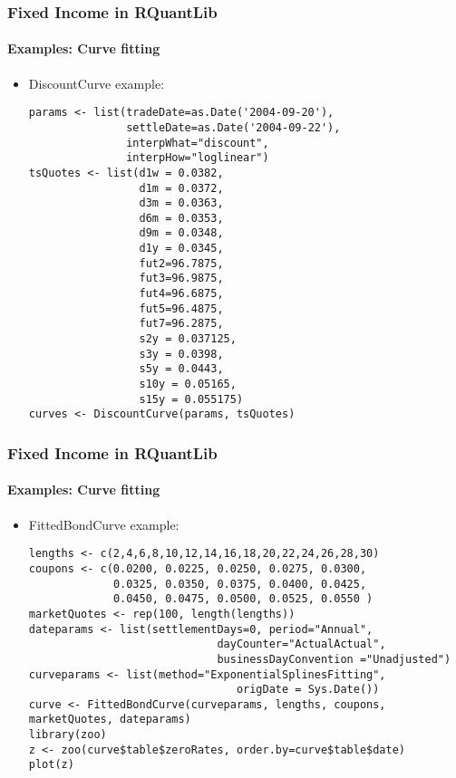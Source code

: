 \documentclass[smaller,compress]{beamer}
\begin{document}
\begin{frame}[fragile]
	\frametitle{Fixed Income in RQuantLib}
	\framesubtitle{Examples: Curve fitting}
	\begin{itemize}
		\item DiscountCurve example:		

			\lstset{language=R,basicstyle=\tiny}
				\begin{lstlisting}		
params <- list(tradeDate=as.Date('2004-09-20'),
               settleDate=as.Date('2004-09-22'),
               interpWhat="discount",
               interpHow="loglinear")
tsQuotes <- list(d1w = 0.0382,
                 d1m = 0.0372,
                 d3m = 0.0363,
                 d6m = 0.0353,
                 d9m = 0.0348,
                 d1y = 0.0345,
                 fut2=96.7875,
                 fut3=96.9875,
                 fut4=96.6875,
                 fut5=96.4875,
                 fut7=96.2875,
                 s2y = 0.037125,
                 s3y = 0.0398,
                 s5y = 0.0443,
                 s10y = 0.05165,
                 s15y = 0.055175)
curves <- DiscountCurve(params, tsQuotes)		
\end{lstlisting}
\end{itemize}
\end{frame}



\begin{frame}[fragile]
	\frametitle{Fixed Income in RQuantLib}
	\framesubtitle{Examples: Curve fitting}
	\begin{itemize}
		\item FittedBondCurve example:
			\lstset{language=R,basicstyle=\tiny}
				\begin{lstlisting}
lengths <- c(2,4,6,8,10,12,14,16,18,20,22,24,26,28,30)
coupons <- c(0.0200, 0.0225, 0.0250, 0.0275, 0.0300,
         	 0.0325, 0.0350, 0.0375, 0.0400, 0.0425,
             0.0450, 0.0475, 0.0500, 0.0525, 0.0550 )
marketQuotes <- rep(100, length(lengths))
dateparams <- list(settlementDays=0, period="Annual", 
                             dayCounter="ActualActual", 
                             businessDayConvention ="Unadjusted")
curveparams <- list(method="ExponentialSplinesFitting", 
                                origDate = Sys.Date())
curve <- FittedBondCurve(curveparams, lengths, coupons, marketQuotes, dateparams)
library(zoo)
z <- zoo(curve$table$zeroRates, order.by=curve$table$date)
plot(z)
				\end{lstlisting}		

\end{itemize}
\end{frame}
\end{document}
